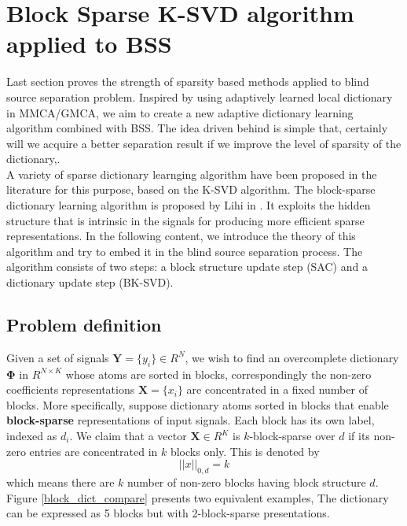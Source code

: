 \section{Block Sparse K-SVD algorithm applied to BSS}
Last section proves the strength of sparsity based methods applied to blind source separation problem. Inspired by using adaptively learned local dictionary in MMCA/GMCA, we aim to create a new adaptive dictionary learning algorithm combined with BSS. The idea driven behind is simple that, certainly will we acquire a better separation result if we improve the level of sparsity of the dictionary,.\\

A variety of sparse dictionary learnging algorithm have been proposed in the literature for this purpose, based on the K-SVD algorithm. The block-sparse dictionary learning algorithm is proposed by Lihi in \cite{dictionary_block_sparse}. It exploits the hidden structure that is intrinsic in the signals for producing more efficient sparse representations. In the following content, we introduce the theory of this algorithm and try to embed it in the blind source separation process. The algorithm consists of two steps: a block structure update step (SAC) and a dictionary update step (BK-SVD). \\

\subsection{Problem definition}
Given a set of signals $\mathbf{Y} = \{y_i\} \in R^N$, we wish to find an overcomplete dictionary $\mathbf{\Phi}$ in $R^{N \times K}$ whose atoms are sorted in blocks, correspondingly the non-zero coefficients representations $\mathbf{X} = \{x_i\}$ are concentrated in a fixed number of blocks. More specifically, suppose dictionary atoms sorted in blocks that enable \textbf{block-sparse} representations of input signals. Each block has its own label, indexed as $d_i$. We claim that a vector $\mathbf{X}\in R^K$ is $k$-block-sparse over $d$ if its non-zero entries are concentrated in $k$ blocks only. This is denoted by 
\begin{equation}
    ||x||_{0,d} = k
\end{equation}
which means there are $k$ number of non-zero blocks having block structure $d$. Figure \ref{block_dict_compare} presents two equivalent examples, The dictionary can be expressed as 5 blocks but with 2-block-sparse presentations.\\

